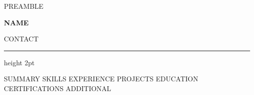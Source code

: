 %
%
{{PREAMBLE}}

\renewcommand{\familydefault}{\sfdefault}

\renewcommand{\cvsectionfont}[1]{%
  {\color{cvaccent}\rule[-0.6pt]{3pt}{12pt}}\hspace{6pt}%
  {\large\bfseries #1}%
}
\renewcommand{\cvsectionrule}{\vspace{2pt}{\color{cvaccent!25}\hrule height 1pt}}

\renewcommand{\cvheader}[2]{%
  {\fontsize{23}{26}\selectfont\bfseries #1}\par\vspace{3pt}%
  {\small\color{cvmuted} #2}\par\vspace{5pt}%
  {\color{cvaccent}\hrule height 2pt}%
  \vspace{2pt}%
}



\cvheader{ {{NAME}} }{ {{CONTACT}} }

{{SUMMARY}}
{{SKILLS}}
{{EXPERIENCE}}
{{PROJECTS}}
{{EDUCATION}}
{{CERTIFICATIONS}}
{{ADDITIONAL}}



